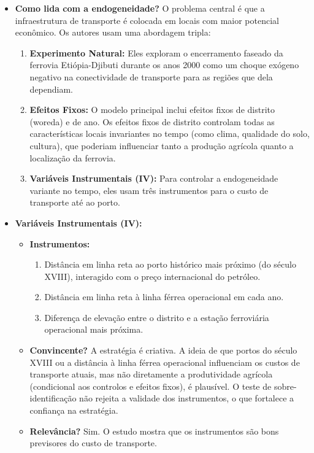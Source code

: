 \documentclass[12pt, a4paper]{article}
\begin{document}
\begin{itemize}
    \item \textbf{Como lida com a endogeneidade?} O problema central é que a infraestrutura de transporte é colocada em locais com maior potencial econômico. Os autores usam uma abordagem tripla:
    \begin{enumerate}
        \item \textbf{Experimento Natural:} Eles exploram o encerramento faseado da ferrovia Etiópia-Djibuti durante os anos 2000 como um choque exógeno negativo na conectividade de transporte para as regiões que dela dependiam.
        \item \textbf{Efeitos Fixos:} O modelo principal inclui efeitos fixos de distrito (woreda) e de ano. Os efeitos fixos de distrito controlam todas as características locais invariantes no tempo (como clima, qualidade do solo, cultura), que poderiam influenciar tanto a produção agrícola quanto a localização da ferrovia.
        \item \textbf{Variáveis Instrumentais (IV):} Para controlar a endogeneidade variante no tempo, eles usam três instrumentos para o custo de transporte até ao porto.
    \end{enumerate}

    \item \textbf{Variáveis Instrumentais (IV):}
    \begin{itemize}
        \item \textbf{Instrumentos:}
            \begin{enumerate}
                \item Distância em linha reta ao porto histórico mais próximo (do século XVIII), interagido com o preço internacional do petróleo.
                \item Distância em linha reta à linha férrea operacional em cada ano.
                \item Diferença de elevação entre o distrito e a estação ferroviária operacional mais próxima.
            \end{enumerate}
        \item \textbf{Convincente?} A estratégia é criativa. A ideia de que portos do século XVIII ou a distância à linha férrea operacional influenciam os custos de transporte atuais, mas não diretamente a produtividade agrícola (condicional aos controlos e efeitos fixos), é plausível. O teste de sobre-identificação não rejeita a validade dos instrumentos, o que fortalece a confiança na estratégia.
        \item \textbf{Relevância?} Sim. O estudo mostra que os instrumentos são bons previsores do custo de transporte.
    \end{itemize}
\end{itemize}
\end{document}
